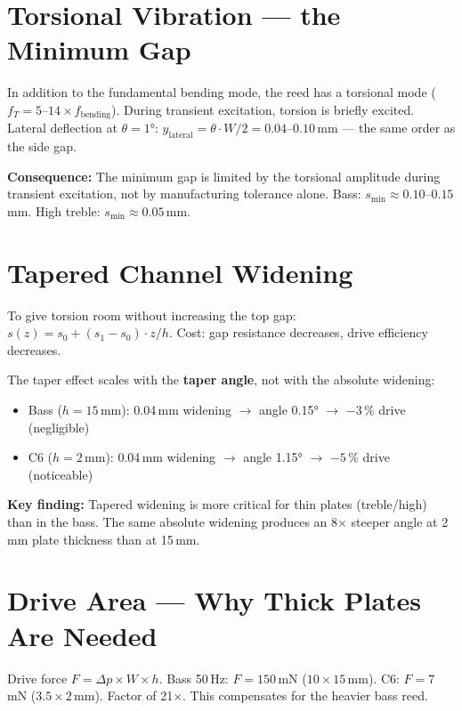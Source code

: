 \documentclass[11pt,a4paper]{article}
\begin{document}
\section{Torsional Vibration --- the Minimum Gap}

In addition to the fundamental bending mode, the reed has a torsional mode ($f_T = 5$--$14 \times f_\text{bending}$). During transient excitation, torsion is briefly excited. Lateral deflection at $\theta = 1°$: $y_\text{lateral} = \theta \cdot W/2 = 0{.}04$--$0{.}10$\,mm --- the same order as the side gap.

\begin{keybox}
\textbf{Consequence:} The minimum gap is limited by the torsional amplitude during transient excitation, not by manufacturing tolerance alone. Bass: $s_\text{min} \approx 0{.}10$--$0{.}15$\,mm. High treble: $s_\text{min} \approx 0{.}05$\,mm.
\end{keybox}

\section{Tapered Channel Widening}

To give torsion room without increasing the top gap: $s(z) = s_0 + (s_1 - s_0) \cdot z/h$. Cost: gap resistance decreases, drive efficiency decreases.

The taper effect scales with the \textbf{taper angle}, not with the absolute widening:

\begin{itemize}
\item Bass ($h = 15$\,mm): 0.04\,mm widening $\to$ angle 0.15° $\to$ $-3\,\%$ drive (negligible)
\item C6 ($h = 2$\,mm): 0.04\,mm widening $\to$ angle 1.15° $\to$ $-5$\,\% drive (noticeable)
\end{itemize}

\begin{keybox}
\textbf{Key finding:} Tapered widening is more critical for thin plates (treble/high) than in the bass. The same absolute widening produces an 8$\times$ steeper angle at 2\,mm plate thickness than at 15\,mm.
\end{keybox}

\section{Drive Area --- Why Thick Plates Are Needed}

Drive force $F = \Delta p \times W \times h$. Bass 50\,Hz: $F = 150$\,mN ($10 \times 15$\,mm). C6: $F = 7$\,mN ($3{.}5 \times 2$\,mm). Factor of 21$\times$. This compensates for the heavier bass reed.
\end{document}
